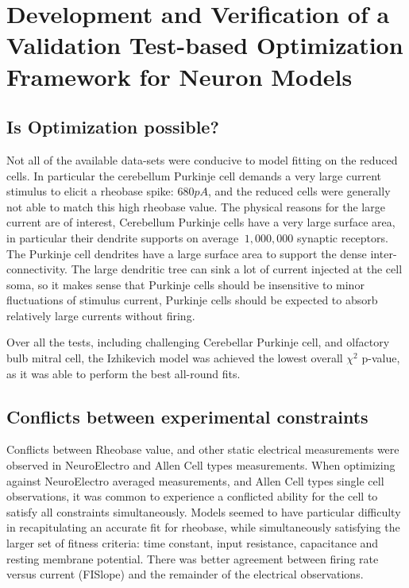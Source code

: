 
\section{Development and Verification of a Validation Test-based Optimization Framework for Neuron Models}

\subsection{Is Optimization possible?}
Not all of the available data-sets were conducive to model fitting on the reduced cells. In particular the cerebellum Purkinje cell demands a very large current stimulus to elicit a rheobase spike: $680pA$, and the reduced cells were generally not able to match this high rheobase value. The physical reasons for the large current are of interest, Cerebellum Purkinje cells have a very large surface area, in particular their dendrite supports on average $~1,000,000 $ synaptic receptors. The Purkinje cell dendrites have a large surface area to support the dense inter-connectivity. The large dendritic tree can sink a lot of current injected at the cell soma, so it makes sense that Purkinje cells should be insensitive to minor fluctuations of stimulus current, Purkinje cells should be expected to absorb relatively large currents without firing.

Over all the tests, including challenging Cerebellar Purkinje cell, and olfactory bulb mitral cell, the Izhikevich model was achieved the lowest overall $\chi^{2}$ p-value, as it was able to perform the best all-round fits. %

\subsection{Conflicts between experimental constraints}
Conflicts between Rheobase value, and other static electrical measurements were observed in NeuroElectro and Allen Cell types measurements. When optimizing against NeuroElectro averaged measurements, and Allen Cell types single cell observations, it was common to experience a conflicted ability for the cell to satisfy all constraints simultaneously. 
Models seemed to have particular difficulty in recapitulating an accurate fit for rheobase, while simultaneously satisfying the larger set of fitness criteria: time constant, input resistance, capacitance and resting membrane potential. There was better agreement between firing rate versus current (FISlope) and the remainder of the electrical observations.


